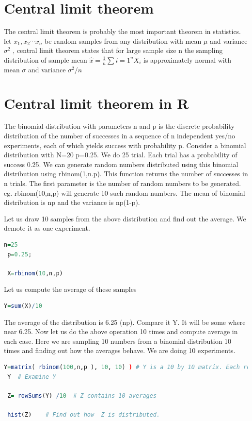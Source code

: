\documentclass["../Applied_probabillity _and_statistics_lab_KTU.tex"]{subfiles}
\begin{document}
   \section{Central limit theorem}
   The  central limit theorem is probably the most important theorem in statistics. let $x_1,x_2\cdots x_n$ be random samples from any distribution with mean $\mu$ and variance $\sigma ^2$ , central limit theorem states that  for large sample size n the sampling distribution of sample mean $\hat{x} = \frac{1}{n}\sum{i=1}^{n} X_i$ is approximately normal with mean $\sigma$ and variance $\sigma^2 / n$ 
   \section{Central limit theorem in R}
   The binomial distribution with parameters n and p is the discrete probability distribution of the number of successes in a sequence of n independent yes/no experiments, each of which yields success with probability p.
    Consider a binomial distribution with N=20 p=0.25. We do 25 trial. Each trial has a probability of success 0.25.
    We can generate random numbers distributed using this binomial distribution using 
    rbinom(1,n.p). This function returns the number of successes  in n trials.
    The first parameter is the number of random numbers to be generated. eg. rbinom(10,n,p) will generate 10 such random numbers. 
    The mean of binomial distribution is np and the variance is np(1-p). 
    
    Let us draw 10 samples from the above distribution and find out the average.  We demote it as one experiment.
    
     
\begin{lstlisting}[language=R]
 n=25
 p=0.25;
 
 X=rbinom(10,n,p)
\end{lstlisting}
 Let us compute the average of these samples
 \begin{lstlisting}[language=R]
 Y=sum(X)/10
\end{lstlisting}

The average of the distribution is 6.25 (np). Compare it Y. It will be some where near 6.25.
Now let us do the above operation 10 times and compute average in each  case. Here we are sampling 10 numbers from a binomial distribution 10 times and finding out how the averages behave.  We are doing 10 experiments.


 \begin{lstlisting}[language=R]
 Y=matrix( rbinom(100,n,p ), 10, 10) ) # Y is a 10 by 10 matrix. Each row contains 10 numbers sampled from the binomial distribution.
 Y  # Examine Y

 Z= rowSums(Y) /10  # Z contains 10 averages  

 hist(Z)    # Find out how  Z is distributed.
 
\end{lstlisting}
\end{document}
